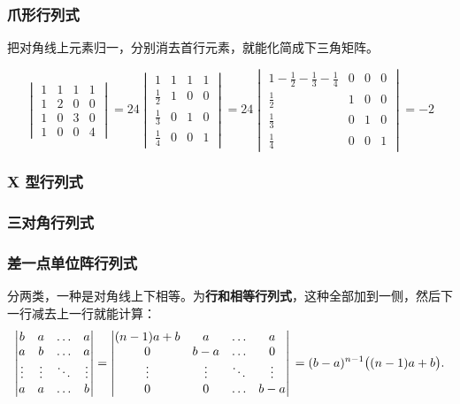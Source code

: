 \subsubsection{爪形行列式}
把对角线上元素归一，分别消去首行元素，就能化简成下三角矩阵。
\begin{example}[爪形行列式]
    \[
        \textstyle
        \begin{vmatrix}
            1 & 1 & 1 & 1 \\
            1 & 2 & 0 & 0 \\
            1 & 0 & 3 & 0 \\
            1 & 0 & 0 & 4
        \end{vmatrix}=
        24
        \begin{vmatrix}
            1 & 1 & 1 & 1 \\
            \tfrac{1}{2} & 1 & 0 & 0 \\
            \tfrac{1}{3} & 0 & 1 & 0 \\
            \tfrac{1}{4} & 0 & 0 & 1
        \end{vmatrix}
        =24
        \begin{vmatrix}
            1-\tfrac{1}{2}-\tfrac{1}{3}-\tfrac{1}{4} & 0 & 0 & 0 \\
            \tfrac{1}{2} & 1 & 0 & 0 \\
            \tfrac{1}{3} & 0 & 1 & 0 \\
            \tfrac{1}{4} & 0 & 0 & 1
        \end{vmatrix}
        = -2
    \]
\end{example}
\subsubsection{X 型行列式}
\subsubsection{三对角行列式}
\subsubsection{差一点单位阵行列式}
分两类，一种是对角线上下相等。为\textbf{行和相等行列式}，这种全部加到一侧，然后下一行减去上一行就能计算：
\[
    \begin{vmatrix}
        b & a & \dots & a \\
        a & b & \dots & a \\
        \vdots &\vdots & \ddots & \vdots \\
        a & a & \dots & b
    \end{vmatrix}
    =
    \begin{vmatrix}
        (n-1)a+b & a & \dots & a \\
        0 & b-a & \dots & 0 \\
        \vdots & \vdots & \ddots & \vdots \\
        0 & 0 & \dots & b-a
    \end{vmatrix} \\
    = (b-a)^{n-1}\bigl((n-1)a+b\bigr).
\]
